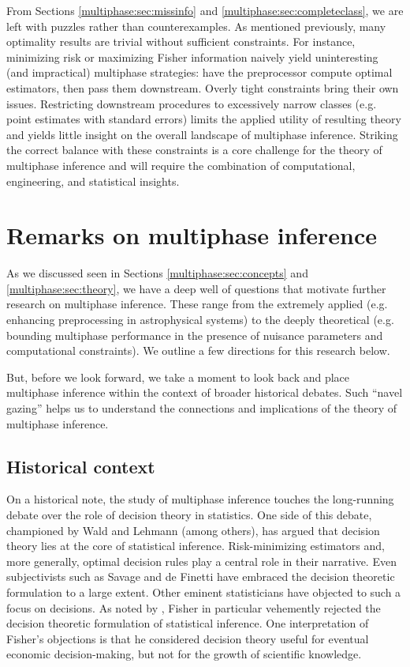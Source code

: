 From Sections \ref{multiphase:sec:missinfo} and \ref{multiphase:sec:completeclass}, we are left with puzzles rather than counterexamples.
As mentioned previously, many optimality results are trivial without sufficient constraints.
For instance, minimizing risk or maximizing Fisher information naively yield uninteresting (and impractical) multiphase strategies: have the preprocessor compute optimal estimators, then pass them downstream.
Overly tight constraints bring their own issues.
Restricting downstream procedures to excessively narrow classes (e.g. point estimates with standard errors) limits the applied utility of resulting theory and yields little insight on the overall landscape of multiphase inference.
Striking the correct balance with these constraints is a core challenge for the theory of multiphase inference and will require the combination of computational, engineering, and statistical insights.

\section{Remarks on multiphase inference}
\label{multiphase:sec:remarks}

As we discussed seen in Sections \ref{multiphase:sec:concepts} and \ref{multiphase:sec:theory}, we have a deep well of questions that motivate further research on multiphase inference.
These range from the extremely applied (e.g. enhancing preprocessing in astrophysical systems) to the deeply theoretical (e.g. bounding multiphase performance in the presence of nuisance parameters and computational constraints).
We outline a few directions for this research below.

But, before we look forward, we take a moment to look back and place multiphase inference within the context of broader historical debates.
Such ``navel gazing'' helps us to understand the connections and implications of the theory of multiphase inference.

\subsection{Historical context}

On a historical note, the study of multiphase inference touches the long-running debate over the role of decision theory in statistics.
One side of this debate, championed by Wald and Lehmann (among others), has argued that decision theory lies at the core of statistical inference.
Risk-minimizing estimators and, more generally, optimal decision rules play a central role in their narrative.
Even subjectivists such as Savage and de Finetti have embraced the decision theoretic formulation to a large extent.
Other eminent statisticians have objected to such a focus on decisions.
As noted by \citet{Savage1976}, Fisher in particular vehemently rejected the decision theoretic formulation of statistical inference.
One interpretation of Fisher's objections is that he considered decision theory useful for eventual economic decision-making, but not for the growth of scientific knowledge.
 
